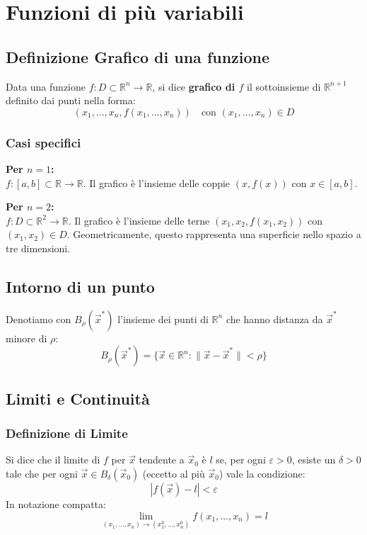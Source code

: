 \chapter{Funzioni di più variabili}
\section{Definizione Grafico di una funzione}
Data una funzione $f: D \subset \mathbb{R}^n \to \mathbb{R}$, si dice \textbf{grafico di $f$} il sottoinsieme di $\mathbb{R}^{n+1}$ definito dai punti nella forma:
\begin{equation*}
    (x_1, \dots, x_n, f(x_1, \dots, x_n)) \quad \text{con } (x_1, \dots, x_n) \in D
\end{equation*}

\subsection{Casi specifici}
\textbf{Per $n=1$:}\\
$f: [a,b] \subset \mathbb{R} \to \mathbb{R}$. Il grafico è l'insieme delle coppie $(x, f(x))$ con $x \in [a,b]$.

\vspace{0.3cm}
\noindent\textbf{Per $n=2$:}\\
$f: D \subset \mathbb{R}^2 \to \mathbb{R}$. Il grafico è l'insieme delle terne $(x_1, x_2, f(x_1, x_2))$ con $(x_1, x_2) \in D$. Geometricamente, questo rappresenta una superficie nello spazio a tre dimensioni.

\section{Intorno di un punto}
Denotiamo con $B_\rho(\vec{x}^*)$ l'insieme dei punti di $\mathbb{R}^n$ che hanno distanza da $\vec{x}^*$ minore di $\rho$:
\begin{equation*}
    B_\rho(\vec{x}^*) = \{\vec{x} \in \mathbb{R}^n : \|\vec{x} - \vec{x}^*\| < \rho\}
\end{equation*}

\section{Limiti e Continuità}
\subsection{Definizione di Limite}
Si dice che il limite di $f$ per $\vec{x}$ tendente a $\vec{x}_0$ è $l$ se, per ogni $\varepsilon > 0$, esiste un $\delta > 0$ tale che per ogni $\vec{x} \in B_\delta(\vec{x}_0)$ (eccetto al più $\vec{x}_0$) vale la condizione:
\begin{equation*}
    |f(\vec{x}) - l| < \varepsilon
\end{equation*}
In notazione compatta:
\begin{equation*}
    \lim_{(x_1, \dots, x_n) \to (x_1^0, \dots, x_n^0)} f(x_1, \dots, x_n) = l
\end{equation*}

